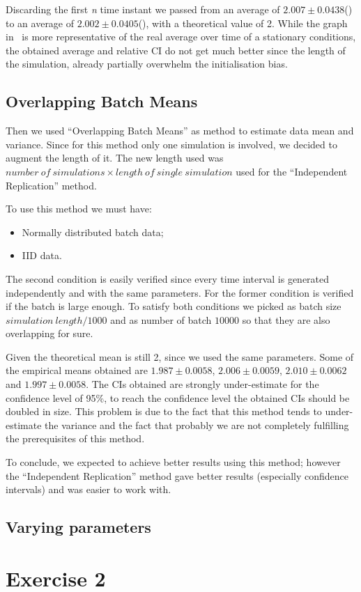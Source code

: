 \documentclass[10pt,a4paper]{article}
\begin{document}
Discarding the first \emph{n} time instant we passed from an average of \(2.007 \pm 0.0438\)() to an average of \(2.002 \pm 0.0405\)(), with a theoretical value of 2. While the graph in~ is more representative of the real average over time of a stationary conditions, the obtained average and relative CI do not get much better since the length of the simulation, already partially overwhelm the initialisation bias.

\subsection*{Overlapping Batch Means}

Then we used ``Overlapping Batch Means'' as method to estimate data mean and variance. Since for this method only one simulation is involved, we decided to augment the length of it. The new length used was \(\mathit{number~of~simulations}\times\mathit{length~of~single~simulation}\) used for the ``Independent Replication'' method.

To use this method we must have:
\begin{itemize}
\item Normally distributed batch data;
\item IID data.
\end{itemize}

The second condition is easily verified since every time interval is generated independently and with the same parameters. For the former condition is verified if the batch is large enough. To satisfy both conditions we picked as batch size \(\mathit{simulation~length} / 1000\) and as number of batch \(10000\) so that they are also overlapping for sure.

Given the theoretical mean is still 2, since we used the same parameters. Some of the empirical means obtained are \( 1.987 \pm 0.0058\), \(2.006 \pm 0.0059\), \(2.010 \pm 0.0062\) and \(1.997 \pm 0.0058\). The CIs obtained are strongly under-estimate for the confidence level of 95\%, to reach the confidence level the obtained CIs should be doubled in size. This problem is due to the fact that this method tends to under-estimate the variance and the fact that probably we are not completely fulfilling the prerequisites of this method.

To conclude, we expected to achieve better results using this method; however the ``Independent Replication'' method gave better results (especially confidence intervals) and was easier to work with.

\subsection{Varying parameters}


\section*{Exercise 2}

\end{document}

